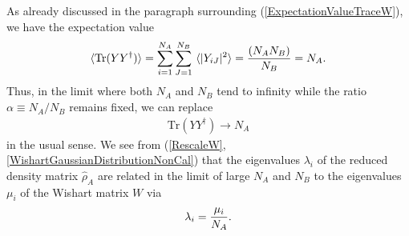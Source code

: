 \documentclass[aps,prb,preprint,onecolumn,amsmath,amssymb,superscriptaddress,eqsecnum,floatfix,scrartcl]{revtex4-1}
\begin{document}
As already discussed in the paragraph surrounding (\ref{ExpectationValueTraceW}),
we have the expectation value
\begin{eqnarray}
\langle \mbox{Tr} (Y Y^\dagger)\rangle = 
\sum_{i=1}^{N_A}\sum_{J=1}^{N_B} \ 
\langle |Y_{iJ}|^2\rangle
={(N_A N_B)\over N_B} = N_A.
\end{eqnarray}
Thus,  in the limit where both $N_A$ and $N_B$ tend to infinity while the ratio $\alpha\equiv N_A/N_B$ remains fixed, 
we can replace 
\begin{eqnarray}
\label{AppendixLimitTrYYdagNA}
\mbox{Tr} (Y Y^\dagger) \to N_A
\end{eqnarray}
 in the usual sense. We see from 
(\ref{RescaleW}, \ref{WishartGaussianDistributionNonCal})
that the eigenvalues $\lambda_i$ of the reduced density
matrix ${\hat \rho}_A$ are related in the  limit of large $N_A$ and $N_B$ to the eigenvalues $\mu_i$ of the Wishart matrix $W$
via
\begin{eqnarray}
\label{DEFEigenvaluesOfRhoA}
\lambda_i = {\mu_i\over N_A}.
\end{eqnarray}
\end{document}

